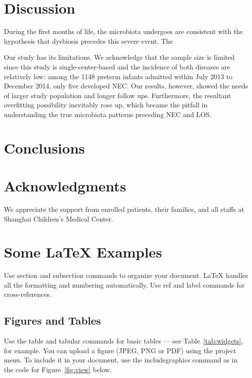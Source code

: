 \documentclass[fleqn,10pt,lineno]{wlpeerj} %
\begin{document}
\section*{Discussion}
During the first months of life, the microbiota undergoes
are consistent with the hypothesis that dysbiosis precedes this severe event. The

\noindent
Our study has its limitations. We acknowledge that the sample size is limited since this study is single-center-based and the incidence of both diseases are relatively low: among the 1148 preterm infants admitted within July 2013 to December 2014, only five developed NEC. Our results, however, showed the needs of larger study population and longer follow ups.
Furthermore, the resultant overfitting possibility inevitably rose up, which became the pitfall in understanding the true microbiota patterns preceding NEC and LOS.

\section*{Conclusions}


\section*{Acknowledgments}
We appreciate the support from enrolled patients, their families, and all staffs at Shanghai Children’s Medical Center.







\section*{Some \LaTeX{} Examples}
\label{sec:examples}

Use section and subsection commands to organize your document. \LaTeX{} handles all the formatting and numbering automatically. Use ref and label commands for cross-references.

\subsection*{Figures and Tables}

Use the table and tabular commands for basic tables --- see Table~\ref{tab:widgets}, for example. You can upload a figure (JPEG, PNG or PDF) using the project menu. To include it in your document, use the includegraphics command as in the code for Figure~\ref{fig:view} below.
\end{document}
